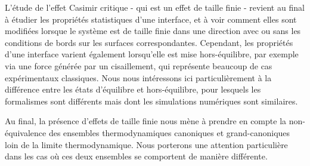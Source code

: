 L'étude de l'effet Casimir critique - qui est un effet de taille finie - revient au final à étudier les propriétés statistiques d'une interface, et à voir comment elles sont modifiées lorsque le système est de taille finie dans une direction avec ou sans les conditions de bords sur les surfaces correspondantes. Cependant, les propriétés d'une interface varient également lorsqu'elle est mise hors-équilibre, par exemple via une force générée par un cisaillement, qui représente beaucoup de cas expérimentaux classiques. 
Nous nous intéressons ici particulièrement à la différence entre les états d'équilibre et hors-équilibre, pour lesquels les formalismes sont différents mais dont les simulations numériques sont similaires.

Au final, la présence d'effets de taille finie nous mène à prendre en compte la non-équivalence des ensembles thermodynamiques canoniques et grand-canoniques loin de la limite thermodynamique. Nous porterons une attention particulière dans les cas où ces deux ensembles se comportent de manière différente.

